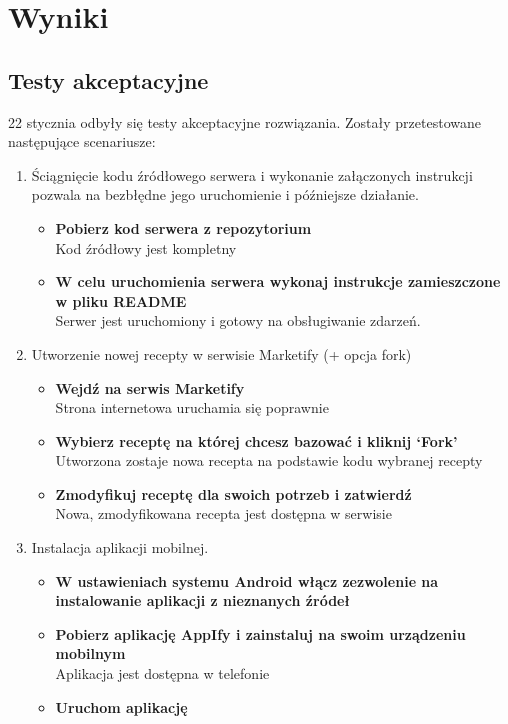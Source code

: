 \documentclass[11pt,a4paper,polish,thesis]{dcsbook}
\begin{document}
\chapter{Wyniki}
\section{Testy akceptacyjne}
22 stycznia odbyły się testy akceptacyjne rozwiązania. Zostały przetestowane następujące scenariusze:
\begin{enumerate}
\item
Ściągnięcie kodu źródłowego serwera i wykonanie załączonych instrukcji pozwala na bezbłędne jego uruchomienie i późniejsze działanie.
\begin{itemize}
\item \textbf{Pobierz kod serwera z repozytorium}\\
Kod źródłowy jest kompletny
\item \textbf{W celu uruchomienia serwera wykonaj instrukcje zamieszczone w pliku README}\\
Serwer jest uruchomiony i gotowy na obsługiwanie zdarzeń.
\end{itemize}
\item
Utworzenie nowej recepty w serwisie Marketify (+ opcja fork)
\begin{itemize}
\item \textbf{Wejdź na serwis Marketify}\\
Strona internetowa uruchamia się poprawnie
\item \textbf{Wybierz receptę na której chcesz bazować i kliknij ‘Fork’}\\
Utworzona zostaje nowa recepta na podstawie kodu wybranej recepty
\item \textbf{Zmodyfikuj receptę dla swoich potrzeb i zatwierdź}\\
Nowa, zmodyfikowana recepta jest dostępna w serwisie
\end{itemize}
\item
Instalacja aplikacji mobilnej.
\begin{itemize}
\item \textbf{W ustawieniach systemu Android włącz zezwolenie na instalowanie aplikacji z nieznanych źródeł}\\
\item \textbf{Pobierz aplikację AppIfy i zainstaluj na swoim urządzeniu mobilnym}\\
Aplikacja jest dostępna w telefonie
\item \textbf{Uruchom aplikację}\\

\end{itemize}
\end{enumerate}
\end{document}
